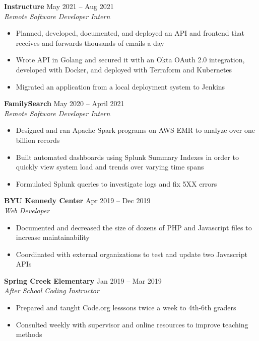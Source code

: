 \documentclass[letterpaper]{article}
\begin{document}
\textbf{Instructure} \hfill May 2021 -- Aug 2021\\
\textit{Remote Software Developer Intern}\\
\vspace{-1mm}
\begin{itemize} \itemsep 1pt
	\item Planned, developed, documented, and deployed an API and frontend that receives and forwards thousands of emails a day
	\item Wrote API in Golang and secured it with an Okta OAuth 2.0 integration, developed with Docker, and deployed with Terraform and Kubernetes
	\item Migrated an application from a local deployment system to Jenkins
\end{itemize}
\textbf{FamilySearch} \hfill May 2020 -- April 2021\\
\textit{Remote Software Developer Intern}\\
\vspace{-1mm}
\begin{itemize} \itemsep 1pt
	\item Designed and ran Apache Spark programs on AWS EMR to analyze over one billion records
	\item Built automated dashboards using Splunk Summary Indexes in order to quickly view system load and trends over varying time spans
	\item Formulated Splunk queries to investigate logs and fix 5XX errors
    
\end{itemize}
\textbf{BYU Kennedy Center} \hfill Apr 2019 -- Dec 2019\\
\textit{Web Developer}\\
\vspace{-1mm}
\begin{itemize} \itemsep 1pt
	\item Documented and decreased the size of dozens of PHP and Javascript files to increase maintainability
	\item Coordinated with external organizations to test and update two Javascript APIs
\end{itemize}
\textbf{Spring Creek Elementary} \hfill Jan 2019 -- Mar 2019\\
\textit{After School Coding Instructor}\\
\vspace{-1mm}
\begin{itemize} \itemsep 1pt
	\item Prepared and taught Code.org lesssons twice a week to 4th-6th graders
	\item Consulted weekly with supervisor and online resources to improve teaching methods
\end{itemize}
\end{document}
